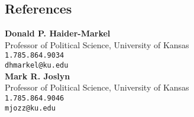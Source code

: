\documentclass[margin,line,pifont,palatino,courier]{res}
\begin{document}
\begin{resume}






\section{\sc References}

{\bf Donald P. Haider-Markel} \\
Professor of Political Science, University of Kansas \\
\verb+1.785.864.9034+\\
\texttt{dhmarkel@ku.edu}\\

{\bf Mark R. Joslyn} \\
Professor of Political Science, University of Kansas \\
\verb+1.785.864.9046+\\
\texttt{mjozz@ku.edu}\\

\end{resume}
\end{document}
